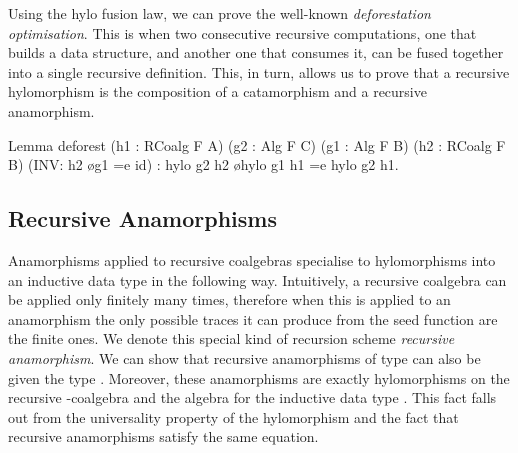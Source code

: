 \documentclass[anonymous, a4paper, UKenglish, cleveref, autoref, thm-restate]{lipics-v2021}
\begin{document}
Using the hylo fusion law, we can prove the well-known \emph{deforestation
optimisation}. This is when two consecutive recursive computations, one that
builds a data structure, and another one that consumes it, can be fused together
into a single recursive definition. This, in turn, allows us to prove that a
recursive hylomorphism is the composition of a catamorphism and a recursive
anamorphism.
\begin{coqcode}
Lemma deforest (h1 : RCoalg F A) (g2 : Alg F C)
  (g1 : Alg F B) (h2 : RCoalg F B) (INV: h2 \o g1 =e id)
  : hylo g2 h2 \o hylo g1 h1 =e hylo g2 h1.
\end{coqcode}

\subsection{Recursive Anamorphisms}
Anamorphisms applied to recursive coalgebras specialise to hylomorphisms into an
inductive data type in the following way.  Intuitively, a recursive coalgebra
can be applied only finitely many times, therefore when this is applied to an
anamorphism the only possible traces it can produce from the seed function are
the finite ones. We denote this special kind of recursion scheme \emph{recursive
anamorphism}.  We can show that recursive anamorphisms of type 
can also be given the type . Moreover, these anamorphisms are
exactly hylomorphisms on the recursive -coalgebra and the
algebra  for the inductive data type . This fact falls out
from the universality property of the hylomorphism and the fact that recursive
anamorphisms satisfy the same equation.
\end{document}
